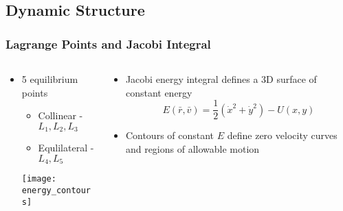 \subsection*{Dynamic Structure}
\begin{frame} %
\frametitle{Lagrange Points and Jacobi Integral}
\begin{columns}
\begin{column}{0.5\textwidth}
  \begin{itemize}
  \item \num{5} equilibrium points 
  \begin{itemize}
  	\item Collinear - \( L_1, L_2, L_3\)
  	\item Equlilateral - \( L_4, L_5\)
    \end{itemize}  
	\texttt{[image: energy\_contours]}
 \end{itemize}
 \end{column}
 \begin{column}{0.5\textwidth}
 \begin{itemize}
 	\item Jacobi energy integral defines a 3D surface of constant energy
 	  \begin{equation*}
		E\left( \bar{r} , \bar{v} \right) = \frac{1}{2}\left( \dot{x}^2 + \dot{y}^2\right) - U\left(x,y \right)
	\label{eq:jacobi}
	\end{equation*}
	\item Contours of constant \( E\) define zero velocity curves and regions of allowable motion
	\end{itemize}
 \end{column}
 \end{columns}
 
\end{frame}   %
